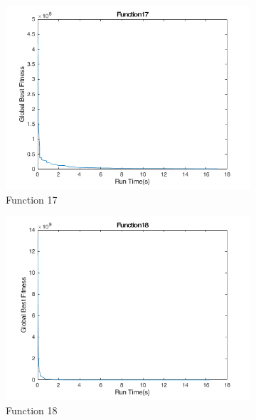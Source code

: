 \begin{figure}
  \begin{subfigure}[b]{0.4\textwidth}
    \includegraphics[width=\textwidth]{img/cecrt/f17}
    \caption{Function 17}
  \end{subfigure}
  \begin{subfigure}[b]{0.4\textwidth}
    \includegraphics[width=\textwidth]{img/cecrt/f18}
    \caption{Function 18}
  \end{subfigure}
  \begin{subfigure}[b]{0.4\textwidth}

\end{subfigure}
\end{figure}
